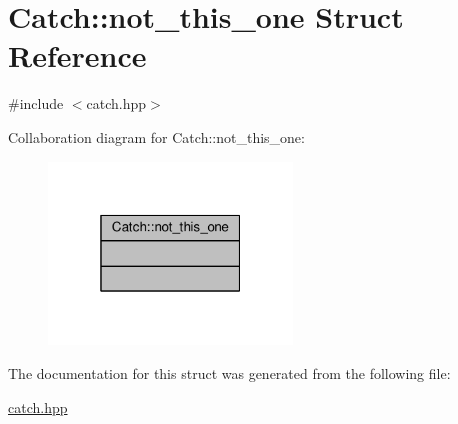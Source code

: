 \hypertarget{struct_catch_1_1not__this__one}{\section{Catch\-:\-:not\-\_\-this\-\_\-one Struct Reference}
\label{struct_catch_1_1not__this__one}
}


{\ttfamily \#include $<$catch.\-hpp$>$}



Collaboration diagram for Catch\-:\-:not\-\_\-this\-\_\-one\-:
\nopagebreak
\begin{figure}[H]
\begin{center}
\leavevmode
\includegraphics[width=184pt]{struct_catch_1_1not__this__one__coll__graph}
\end{center}
\end{figure}


The documentation for this struct was generated from the following file\-:\begin{DoxyCompactItemize}
\item 
\hyperlink{catch_8hpp}{catch.\-hpp}\end{DoxyCompactItemize}
